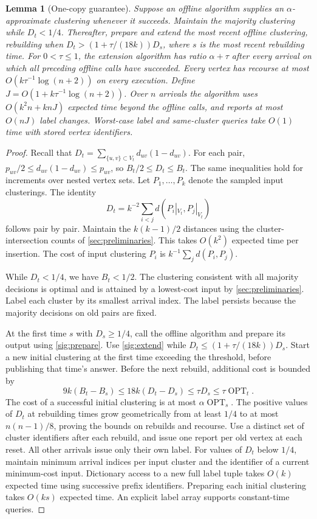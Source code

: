 \documentclass[11pt]{article}
\newtheorem{lemma}[theorem]{Lemma}
\begin{document}
\begin{lemma}[One-copy guarantee]
\label{sig:base}
Suppose an offline algorithm supplies an $\alpha$-approximate
clustering whenever it succeeds. Maintain the majority clustering while
$D_t<1/4$. Thereafter, prepare and extend the most recent offline
clustering, rebuilding when $D_t>(1+\tau/(18k))D_s$, where $s$ is
the most recent rebuilding time. For $0<\tau\le1$, the extension algorithm
has ratio $\alpha+\tau$ after every arrival on which all preceding
offline calls have succeeded. Every vertex has recourse at most
$O(k\tau^{-1}\log(n+2))$ on every execution. Define
$J=O(1+k\tau^{-1}\log(n+2))$. Over $n$ arrivals the algorithm
uses $O(k^2 n +k nJ)$ expected time beyond the offline calls, and
reports at most $O(nJ)$ label changes. Worst-case label and
same-cluster queries take $O(1)$ time with stored vertex identifiers.
\end{lemma}
\begin{proof}
Recall that $D_t=\sum_{\{u,v\}\subset V_t}d_{uv}(1-d_{uv})$.
For each pair, $p_{uv}/2\le d_{uv}(1-d_{uv})\le p_{uv}$, so
$B_t/2\le D_t\le B_t$.
The same inequalities hold for increments over nested vertex sets.
Let $P_1,\ldots,P_k$ denote the sampled input clusterings. The identity
\[
 D_t=k^{-2}\sum_{i<j}d(P_i|_{V_t},P_j|_{V_t})
\]
follows pair by pair. Maintain the $k(k-1)/2$ distances using the cluster-intersection
counts of \cref{sec:preliminaries}. This takes $O(k^2)$
expected time per insertion. The cost of input clustering $P_i$ is $k^{-1}\sum_j d(P_i,P_j)$.

While $D_t<1/4$, we have $B_t<1/2$. The clustering consistent with all majority decisions is optimal
and is attained by a lowest-cost input by \cref{sec:preliminaries}.
Label each cluster by its smallest arrival index. The label persists
because the majority decisions on old pairs are fixed.

At the first time $s$ with $D_s\ge1/4$, call the offline algorithm and
prepare its output using \cref{sig:prepare}. Use
\cref{sig:extend} while
$D_t\le(1+\tau/(18k))D_s$. Start a new initial clustering at the first time
exceeding the threshold, before publishing that time's answer. Before the next
rebuild, additional cost is bounded by
\[
 9k(B_t-B_s)\le18k(D_t-D_s)\le\tau D_s\le\tau\operatorname{OPT}_t.
\]
The cost of a successful initial clustering is at most $\alpha\operatorname{OPT}_s$.
The positive values of $D_t$ at rebuilding times grow geometrically from at least $1/4$ to
at most $n(n-1)/8$, proving the bounds on rebuilds and recourse. Use a
distinct set of cluster identifiers after each rebuild, and issue one report per old vertex at each
reset. All other arrivals issue only their own label. For values of $D_t$
below $1/4$, maintain minimum arrival indices per input cluster and the
identifier of a current minimum-cost input. Dictionary access to a
new full label tuple takes $O(k)$ expected time using successive prefix
identifiers. Preparing each initial clustering takes $O(ks)$ expected time. An explicit
label array supports constant-time queries.
\end{proof}
\end{document}
